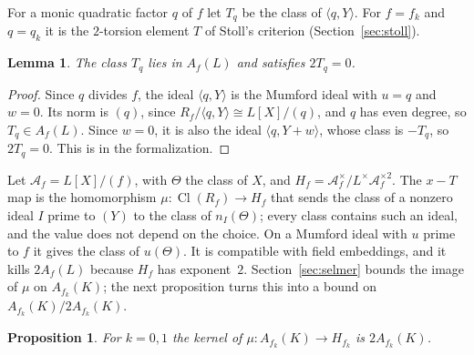 \documentclass[11pt]{amsart}
\newtheorem{lemma}[theorem]{Lemma}
\newtheorem{proposition}[theorem]{Proposition}
\theoremstyle{definition}
\numberwithin{equation}{section}
\newcommand{\Cl}{\operatorname{Cl}}
\newcommand{\lean}[1]{\ignorespaces}
\begin{document}
For a monic quadratic factor $q$ of $f$ let $T_q$ be the class of $\langle q,Y\rangle$. For $f=f_k$ and $q=q_k$ it is the $2$-torsion element $T$ of Stoll's criterion (Section~\ref{sec:stoll}).

\begin{lemma}\label{lem:two-torsion-T}\lean{FurioLombardo.M3a.Genus2.Tpt_sq}
The class $T_q$ lies in $A_f(L)$ and satisfies $2T_q=0$.
\end{lemma}

\begin{proof}
Since $q$ divides $f$, the ideal $\langle q,Y\rangle$ is the Mumford ideal with $u=q$ and $w=0$. Its norm is $(q)$, since $R_f/\langle q,Y\rangle\cong L[X]/(q)$, and $q$ has even degree, so $T_q\in A_f(L)$. Since $w=0$, it is also the ideal $\langle q,Y+w\rangle$, whose class is $-T_q$, so $2T_q=0$. This is  in the formalization.
\end{proof}

Let $\mathcal A_f=L[X]/(f)$, with $\Theta$ the class of $X$, and $H_f=\mathcal A_f^\times/L^\times\mathcal A_f^{\times2}$. The $x-T$ map \cite{Schaefer95,Stoll01} is the homomorphism $\mu:\Cl(R_f)\to H_f$ that sends the class of a nonzero ideal $I$ prime to $(Y)$ to the class of $n_I(\Theta)$; every class contains such an ideal, and the value does not depend on the choice. On a Mumford ideal with $u$ prime to $f$ it gives the class of $u(\Theta)$. It is compatible with field embeddings, and it kills $2A_f(L)$ because $H_f$ has exponent~$2$. Section~\ref{sec:selmer} bounds the image of $\mu$ on $A_{f_k}(K)$; the next proposition turns this into a bound on $A_{f_k}(K)/2A_{f_k}(K)$.

\begin{proposition}\label{prop:xT-kernel}\lean{FurioLombardo.Discharge.M3a.Bruin.xtKernel_fRev', FurioLombardo.Discharge.M3a.Bruin.xtKernel_fRev, FurioLombardo.Discharge.M3a.Bruin.poonenSchaefer_fRev, FurioLombardo.Discharge.M3a.xtKernel_of_deltaTrivial, FurioLombardo.M3a.Genus2.muJ_sq}
For $k=0,1$ the kernel of $\mu:A_{f_k}(K)\to H_{f_k}$ is $2A_{f_k}(K)$.
\end{proposition}
\end{document}
